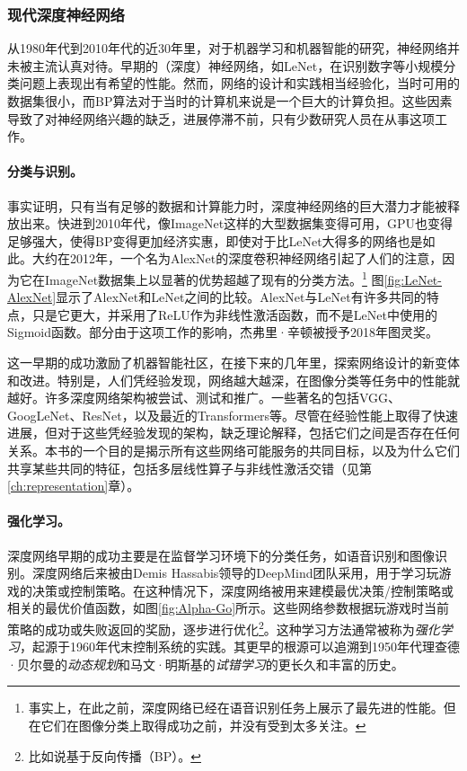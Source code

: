 \documentclass[../../book-main.tex]{subfiles}
\begin{document}
\subsubsection{现代深度神经网络}
从1980年代到2010年代的近30年里，对于机器学习和机器智能的研究，神经网络并未被主流认真对待。早期的（深度）神经网络，如LeNet，在识别数字等小规模分类问题上表现出有希望的性能。然而，网络的设计和实践相当经验化，当时可用的数据集很小，而BP算法对于当时的计算机来说是一个巨大的计算负担。这些因素导致了对神经网络兴趣的缺乏，进展停滞不前，只有少数研究人员在从事这项工作。

\paragraph{分类与识别。}
事实证明，只有当有足够的数据和计算能力时，深度神经网络的巨大潜力才能被释放出来。快进到2010年代，像ImageNet这样的大型数据集变得可用，GPU也变得足够强大，使得BP变得更加经济实惠，即使对于比LeNet大得多的网络也是如此。大约在2012年，一个名为AlexNet的深度卷积神经网络引起了人们的注意，因为它在ImageNet数据集上以显著的优势超越了现有的分类方法\cite{krizhevsky2012imagenet}。\footnote{事实上，在此之前，深度网络已经在语音识别任务上展示了最先进的性能。但在它们在图像分类上取得成功之前，并没有受到太多关注。} 图\ref{fig:LeNet-AlexNet}显示了AlexNet和LeNet之间的比较。AlexNet与LeNet有许多共同的特点，只是它更大，并采用了ReLU作为非线性激活函数，而不是LeNet中使用的Sigmoid函数。部分由于这项工作的影响，杰弗里·辛顿被授予2018年图灵奖。


这一早期的成功激励了机器智能社区，在接下来的几年里，探索网络设计的新变体和改进。特别是，人们凭经验发现，网络越大越深，在图像分类等任务中的性能就越好。许多深度网络架构被尝试、测试和推广。一些著名的包括VGG\cite{Simonyan15}、GoogLeNet\cite{Szegedy2014GoingDW}、ResNet\cite{He2016-lc}，以及最近的Transformers\cite{vaswani2017attention}等。尽管在经验性能上取得了快速进展，但对于这些凭经验发现的架构，缺乏理论解释，包括它们之间是否存在任何关系。本书的一个目的是揭示所有这些网络可能服务的共同目标，以及为什么它们共享某些共同的特征，包括多层线性算子与非线性激活交错（见第\ref{ch:representation}章）。

\paragraph{强化学习。}
深度网络早期的成功主要是在监督学习环境下的分类任务，如语音识别和图像识别。深度网络后来被由Demis Hassabis领导的DeepMind团队采用，用于学习玩游戏的决策或控制策略。在这种情况下，深度网络被用来建模最优决策/控制策略或相关的最优价值函数，如图\ref{fig:Alpha-Go}所示。这些网络参数根据玩游戏时当前策略的成功或失败返回的奖励，逐步进行优化\footnote{比如说基于反向传播（BP）。}。这种学习方法通常被称为{\em 强化学习}\cite{Sutton-Barto}，起源于1960年代末控制系统的实践\cite{Waltz1965AHA,Mendel1970ReinforcementlearningCA}。其更早的根源可以追溯到1950年代理查德·贝尔曼的{\em 动态规划}\cite{Bellman-DP}和马文·明斯基的{\em 试错学习}\cite{Minsky-1954}的更长久和丰富的历史。
\end{document}
